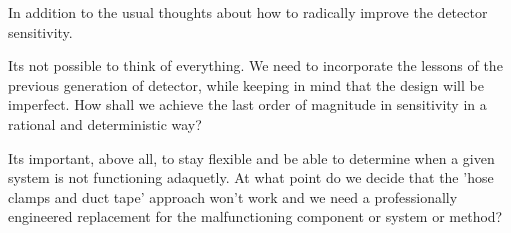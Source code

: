 In addition to the usual thoughts about how to radically improve the detector sensitivity.

Its not possible to think of everything. We need to incorporate the lessons of
the previous generation of detector, while keeping in mind that the design will
be imperfect. How shall we achieve the last order of magnitude in sensitivity
in a rational and deterministic way?

Its important, above all, to stay flexible
and be able to determine when a given system is not functioning adaquetly. At
what point do we decide that the 'hose clamps and duct tape' approach won't
work and we need a professionally engineered replacement for the
malfunctioning component or system or method?
